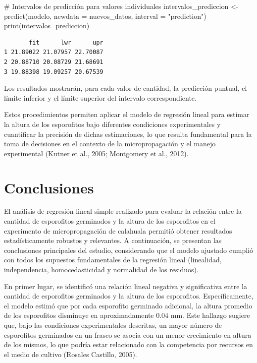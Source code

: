\documentclass[
  spanish,
  a4paper,
  DIV=11,
  numbers=noendperiod,
  onepage,
  openany]{scrreprt}
\newenvironment{Shaded}{\begin{snugshade}}{\end{snugshade}}
\newcommand{\AttributeTok}[1]{\textcolor[rgb]{0.40,0.45,0.13}{#1}}
\newcommand{\CommentTok}[1]{\textcolor[rgb]{0.37,0.37,0.37}{#1}}
\newcommand{\FunctionTok}[1]{\textcolor[rgb]{0.28,0.35,0.67}{#1}}
\newcommand{\NormalTok}[1]{\textcolor[rgb]{0.00,0.23,0.31}{#1}}
\newcommand{\OtherTok}[1]{\textcolor[rgb]{0.00,0.23,0.31}{#1}}
\newcommand{\StringTok}[1]{\textcolor[rgb]{0.13,0.47,0.30}{#1}}
\begin{document}
\begin{Shaded}
\begin{Highlighting}[]
\CommentTok{\# Intervalos de predicción para valores individuales}
\NormalTok{intervalos\_prediccion }\OtherTok{\textless{}{-}} \FunctionTok{predict}\NormalTok{(modelo, }
                                 \AttributeTok{newdata =}\NormalTok{ nuevos\_datos, }
                                 \AttributeTok{interval =} \StringTok{"prediction"}\NormalTok{)}
\FunctionTok{print}\NormalTok{(intervalos\_prediccion)}
\end{Highlighting}
\end{Shaded}

\begin{verbatim}
       fit      lwr      upr
1 21.89022 21.07957 22.70087
2 20.88710 20.08729 21.68691
3 19.88398 19.09257 20.67539
\end{verbatim}

Los resultados mostrarán, para cada valor de cantidad, la predicción
puntual, el límite inferior y el límite superior del intervalo
correspondiente.

Estos procedimientos permiten aplicar el modelo de regresión lineal para
estimar la altura de los esporofitos bajo diferentes condiciones
experimentales y cuantificar la precisión de dichas estimaciones, lo que
resulta fundamental para la toma de decisiones en el contexto de la
micropropagación y el manejo experimental (Kutner et al., 2005;
Montgomery et al., 2012).

\section{Conclusiones}\label{conclusiones}

El análisis de regresión lineal simple realizado para evaluar la
relación entre la cantidad de esporofitos germinados y la altura de los
esporofitos en el experimento de micropropagación de calahuala permitió
obtener resultados estadísticamente robustos y relevantes. A
continuación, se presentan las conclusiones principales del estudio,
considerando que el modelo ajustado cumplió con todos los supuestos
fundamentales de la regresión lineal (linealidad, independencia,
homocedasticidad y normalidad de los residuos).

En primer lugar, se identificó una relación lineal negativa y
significativa entre la cantidad de esporofitos germinados y la altura de
los esporofitos. Específicamente, el modelo estimó que por cada
esporofito germinado adicional, la altura promedio de los esporofitos
disminuye en aproximadamente 0.04 mm. Este hallazgo sugiere que, bajo
las condiciones experimentales descritas, un mayor número de esporofitos
germinados en un frasco se asocia con un menor crecimiento en altura de
los mismos, lo que podría estar relacionado con la competencia por
recursos en el medio de cultivo (Rosales Castillo, 2005).
\end{document}
